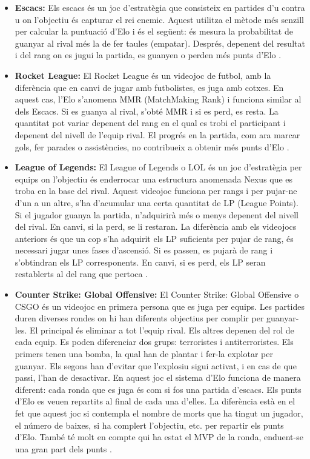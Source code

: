 \documentclass[a4paper]{article}
\begin{document}
\begin{itemize}
    \item \textbf{Escacs:} Els escacs és un joc d'estratègia que consisteix en partides d'u contra u on l'objectiu és capturar el rei enemic. Aquest utilitza el mètode més senzill per calcular la puntuació d'Elo i és el següent: és mesura la probabilitat de guanyar al rival més la de fer taules (empatar). Després, depenent del resultat i del rang on es jugui la partida, es guanyen o perden més punts d'Elo \cite{wikipediaElo}.
    \item \textbf{Rocket League:} El Rocket League és un videojoc de futbol, amb la diferència que en canvi de jugar amb futbolistes, es juga amb cotxes. En aquest cas, l'Elo s'anomena MMR (MatchMaking Rank) i funciona similar al dels Escacs. Si es guanya al rival, s'obté MMR i si es perd, es resta. La quantitat pot variar depenent del rang en el qual es trobi el participant i depenent del nivell de l'equip rival. El progrés en la partida, com ara marcar gols, fer parades o assistències, no contribueix a obtenir més punts d'Elo \cite{rocketElo}.
    \item \textbf{League of Legends:} El League of Legends o LOL és un joc d'estratègia per equips on l'objectiu és enderrocar una estructura anomenada Nexus que es troba en la base del rival. Aquest videojoc funciona per rangs i per pujar-ne d'un a un altre, s'ha d'acumular una certa quantitat de LP (League Points). Si el jugador guanya la partida, n'adquirirà més o menys depenent del nivell del rival. En canvi, si la perd, se li restaran. La diferència amb els videojocs anteriors és que un cop s'ha adquirit els LP suficients per pujar de rang, és necessari jugar unes fases d'ascensió. Si es passen, es pujarà de rang i s'obtindran els LP corresponents. En canvi, si es perd, els LP seran restablerts al del rang que pertoca \cite{LolElo}.
    \item \textbf{Counter Strike: Global Offensive:} El Counter Strike: Global Offensive o CSGO és un videojoc en primera persona que es juga per equips. Les partides duren diverses rondes on hi han diferents objectius per complir per guanyar-les. El principal és eliminar a tot l'equip rival. Els altres depenen del rol de cada equip. Es poden diferenciar dos grups: terroristes i antiterroristes. Els primers tenen una bomba, la qual han de plantar i fer-la explotar per guanyar. Els segons han d'evitar que l'explosiu sigui activat, i en cas de que passi, l'han de desactivar.  En aquest joc el sistema d'Elo funciona de manera diferent: cada ronda que es juga és com si fos una partida d'escacs. Els punts d'Elo es veuen repartits al final de cada una d'elles. La diferència està en el fet que aquest joc si contempla el nombre de morts que ha tingut un jugador, el número de baixes, si ha complert l'objectiu, etc. per repartir els punts d'Elo. També té molt en compte qui ha estat el MVP de la ronda, enduent-se una gran part dels punts \cite{csgoELO1} \cite{csgoELO2}. 
\end{itemize}
\end{document}
